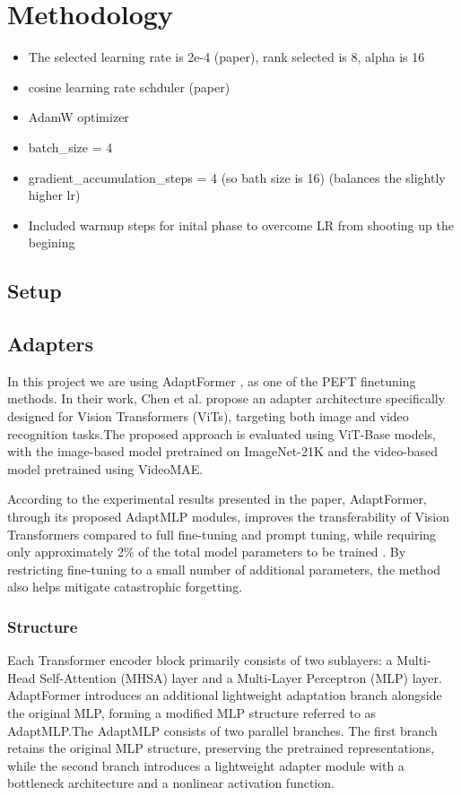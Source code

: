 \documentclass[report.tex]{subfiles}
\begin{document}
    \chapter{Methodology}

    \begin{itemize}
        \item The selected learning rate is 2e-4 (paper), rank selected is 8, alpha is 16 
        \item cosine learning rate schduler (paper)
        \item AdamW optimizer
        \item batch\_size = 4
        \item gradient\_accumulation\_steps = 4 (so bath size is 16) (balances the slightly higher lr)
        \item Included warmup steps for inital phase to overcome LR from shooting up the begining
    \end{itemize}

    \section{Setup}

    \section{Adapters}

    In this project we are using AdaptFormer \cite{chen2022adaptformer}, as one of the PEFT finetuning methods. In their work, Chen et al. propose an adapter architecture specifically designed for Vision Transformers (ViTs), targeting both image and video recognition tasks.The proposed approach is evaluated using ViT-Base models, with the image-based model pretrained on ImageNet-21K and the video-based model pretrained using VideoMAE.

    According to the experimental results presented in the paper, AdaptFormer, through its proposed AdaptMLP modules, improves the transferability of Vision Transformers compared to full fine-tuning and prompt tuning, while requiring only approximately 2\% of the total model parameters to be trained \cite{chen2022adaptformer}. By restricting fine-tuning to a small number of additional parameters, the method also helps mitigate catastrophic forgetting.

    \subsection{Structure}
    Each Transformer encoder block primarily consists of two sublayers: a Multi-Head Self-Attention (MHSA) layer and a Multi-Layer Perceptron (MLP) layer. AdaptFormer introduces an additional lightweight adaptation branch alongside the original MLP, forming a modified MLP structure referred to as AdaptMLP.The AdaptMLP consists of two parallel branches. The first branch retains the original MLP structure, preserving the pretrained representations, while the second branch introduces a lightweight adapter module with a bottleneck architecture and a nonlinear activation function.
\end{document}
